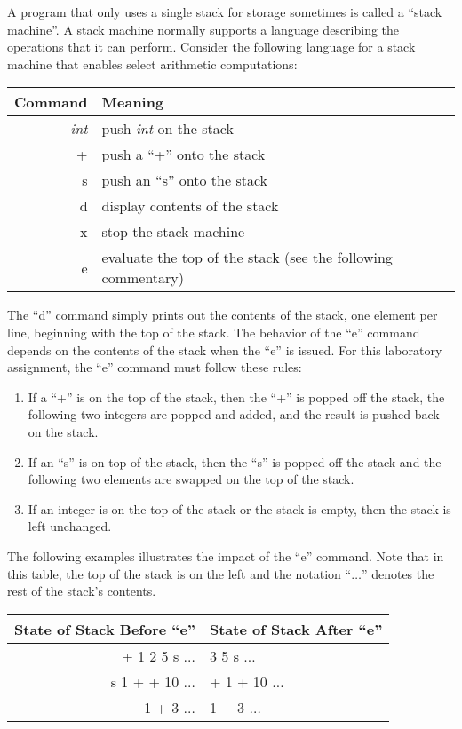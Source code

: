 A program that only uses a single stack for storage sometimes is called a ``stack machine''. A stack machine normally 
supports a language describing the operations that it can perform. Consider the following language for a stack machine
that enables select arithmetic computations:

\begin{tabular}{r | l}
  Command & Meaning \\ \hline
  \emph{int} & push \emph{int} on the stack \\
  + & push a ``+'' onto the stack \\
  s & push an ``s'' onto the stack \\
  d & display contents of the stack \\
  x & stop the stack machine \\
  e & evaluate the top of the stack (see the following commentary) \\
\end{tabular}

The ``d'' command simply prints out the contents of the stack, one element per line, beginning with the top of the
stack. The behavior of the ``e'' command depends on the contents of the stack when the ``e'' is issued. For this
laboratory assignment, the ``e'' command must follow these rules:

\begin{enumerate}

  \item If a ``+'' is on the top of the stack, then the ``+'' is popped off the stack, the following two integers are
    popped and added, and the result is pushed back on the stack.

  \item If an ``s'' is on top of the stack, then the ``s'' is popped off the stack and the following two elements are
    swapped on the top of the stack.

  \item If an integer is on the top of the stack or the stack is empty, then the stack is left unchanged.

\end{enumerate}

The following examples illustrates the impact of the ``e'' command. Note that in this table, the top of the stack is on
the left and the notation ``$\ldots$'' denotes the rest of the stack's contents.

\begin{tabular}{r | l}
  State of Stack Before ``e'' & State of Stack After ``e'' \\ \hline
  + 1 2 5 s $\ldots$  & 3 5 s $\ldots$ \\
  s 1 + + 10 $\ldots$ & + 1 + 10 $\ldots$ \\
  1 + 3 $\ldots$      & 1 + 3 $\ldots$ \\
\end{tabular}

